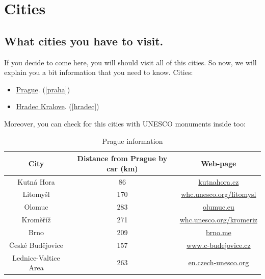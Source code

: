 \documentclass[a4paper, 12pt]{report}
\begin{document}
\newpage
\chapter{Cities}
\section{What cities you have to visit.}

If you decide to come here, you will should visit all of this cities. So now, we will explain you a bit information that you need to know. Cities:
\begin{itemize}
	\item {\href{ttp://whc.unesco.org/en/list/616}{Prague}.} (\ref{praha})
	\item {\href{http://www.ceskatelevize.cz/ct24/regiony/122069-hradec-kralove-chce-byt-na-seznamu-unesco/}{Hradec Kralove}.} (\ref{hradec})
\end{itemize}

Moreover, you can check for this cities with UNESCO monuments inside too:
	\begin{table}[h]
		\begin{center}	
		\begin{tabular}{|c|c|c|}
		\rowcolor{orange}
		\hline
		City & Distance from Prague by car (km) & Web-page \\
		\hline
		Kutná Hora & 86 & \href{http://www.kutnahora.cz/index.php?lns=en}{kutnahora.cz}\\
		\hline
		Litomyšl & 170 & \href{http://whc.unesco.org/en/list/901}{whc.unesco.org/litomysl}\\
		\hline
		Olomuc & 283 & \href{http://www.olomouc.eu/portal/aktuality}{olumuc.eu}\\
		\hline
		Kroměříž & 271 & \href{http://whc.unesco.org/en/list/860}{whc.unesco.org/kromeriz}\\
		\hline
		Brno & 209 & \href{http://www.brno.me/}{brno.me}\\
		\hline
		České Budějovice & 157 & \href{http://www.c-budejovice.cz/stranky/magistrat-mesta-ceske-budejovice.aspx}{www.c-budejovice.cz}\\
		\hline
		Lednice-Valtice Area & 263 & \href{http://en.czech-unesco.org/lednice-valtice-cultural-landscape/introduction/}{en.czech-unesco.org}\\
		\hline
		\end{tabular}
		\caption{Prague information}
		\end{center}
	\end{table}
\end{document}
